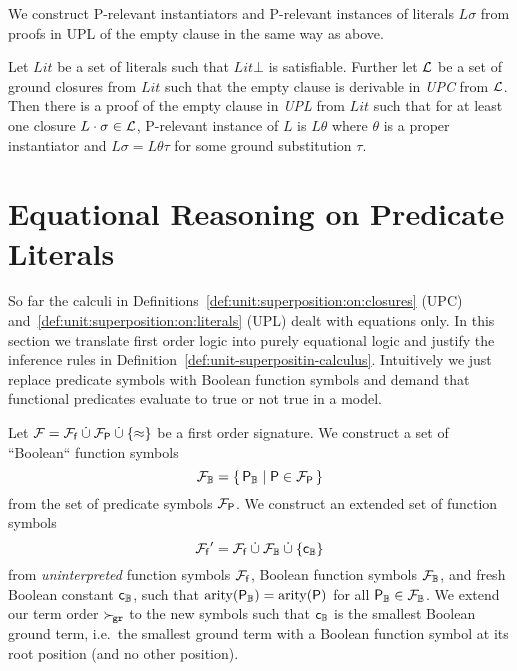    We construct P-relevant instantiators and P-relevant instances
    of literals \( L\sigma \) from proofs in UPL of the empty clause
    in the same way as above.

    \begin{lemma}\cite{GK2004csl}
        Let \(Lit\) be a set of literals such that \( Lit\bot \) is satisfiable.
        Further let \( \mathcal{L} \) be a set of ground closures from \( Lit \)
        such that the empty clause is derivable in \emph{UPC} from \( \mathcal{L} \).
        Then there is a proof of the empty clause in \emph{UPL} from \( Lit \)
        such that for at least one closure \( L \cdot \sigma \in \mathcal{L} \),
        P-relevant instance of \(L\) is \( L\theta \)
        where \( \theta \) is a proper instantiator
        and \( L\sigma = L\theta\tau \) for some ground substitution \( \tau \).
    \end{lemma}

    \section{Equational Reasoning on Predicate Literals}\label{sec:equational:reasoning:on:predicates}

    So far the calculi in Definitions~\ref{def:unit:superposition:on:closures} (UPC)
    and~\ref{def:unit:superposition:on:literals} (UPL) dealt
    with equations only.
    In this section we translate first order logic
    into purely equational logic and
    justify the inference rules in Definition~\vref{def:unit-superpositin-calculus}.
    Intuitively we just replace predicate symbols with Boolean function symbols
    and demand that functional predicates evaluate to true or not true in a model.

    \begin{definition}
        Let \( \mathcal{F} = {\mathcal{F}_{\mathsf{f}}} \mathbin{\dot\cup} {\mathcal{F}_{\mathsf{P}}} \mathbin{\dot\cup} \{\approx \} \) be a first order signature.
        We construct a set of “Boolean“ function symbols
        \[
            {\mathcal{F}}_{\mathbb{B}} = \{ \, {\mathsf{P}}_{\mathbb{B}} \mid \mathsf{P} \in {\mathcal{F}_{\mathsf{P}}} \, \}
        \]
        from the set of predicate symbols \( {\mathcal{F}_{\mathsf{P}}} \).
        We construct an extended set of function symbols
        \[
            {\mathcal{F}_{\mathsf{f}}}' = {\mathcal{F}_{\mathsf{f}}}
            \mathbin{\dot\cup}
            {\mathcal{F}}_{\mathbb{B}}
 \mathbin{\dot\cup}
            \{ {\mathsf{c}}_{\mathbb{B}}
            \}
            \]
        from \emph{uninterpreted} function symbols \( {\mathcal{F}_{\mathsf{f}}} \),
        Boolean function symbols \( {\mathcal{F}}_{\mathbb{B}} \),
        and fresh Boolean constant \( {\mathsf{c}}_{\mathbb{B}} \),
        such that \( \operatorname{arity}({\mathsf{P}}_{\mathbb{B}}) = \operatorname{arity}(\mathsf{P}) \) for all \( {\mathsf{P}}_{\mathbb{B}}\in{\mathcal{F}}_{\mathbb{B}} \).
        We extend our term order \( \mathrel\succ_{\!\mathtt{gr}} \) to the new symbols
        such that \( {\mathsf{c}}_{\mathbb{B}} \) is the smallest Boolean ground term,
        i.e.~the smallest ground term with a Boolean function symbol
        at its root position (and no other position).
    \end{definition}

